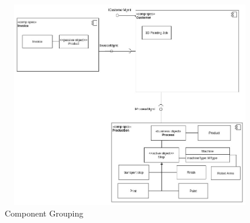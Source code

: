 \documentclass[aspectratio=1610,onlymath]{beamer}
\begin{document}
\begin{figure}[ht]
\centering
\includegraphics[width=1\textwidth, height=90mm]{05_component-grouping}
\caption{Component Grouping}
\end{figure}
\end{document}
